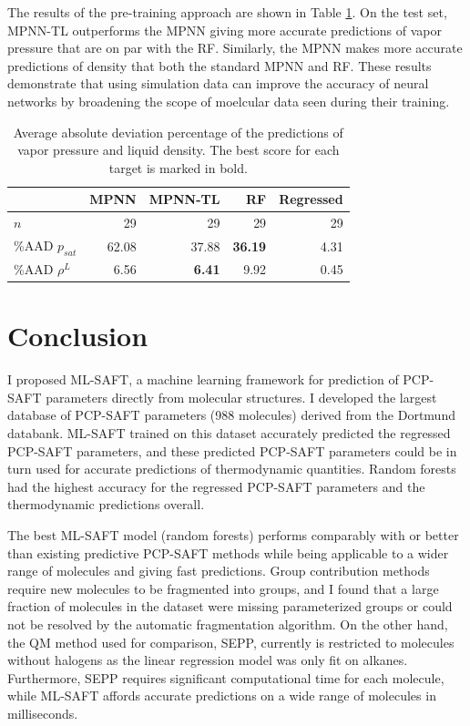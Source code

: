 The results of the pre-training approach are shown in Table \ref{tab:scores_tl}. On the test set, MPNN-TL outperforms the MPNN giving more accurate predictions of vapor pressure that are on par with the RF. Similarly, the MPNN makes more accurate predictions of density that both the standard MPNN and RF. These results demonstrate that using simulation data can improve the accuracy of neural networks by broadening the scope of moelcular data seen during their training. 

\begin{table}
    \caption{Average absolute deviation percentage of the predictions of vapor pressure and liquid density. The best score for each target is marked in bold.}
    \begin{center}
        \begin{tabular}{lrrr|r}
             & MPNN & MPNN-TL & RF & Regressed \\
            \hline
            $n$ & 29 & 29 & 29 & 29 \\
            \%AAD $p_{sat}$ & 62.08 & 37.88 & \textbf{36.19} & 4.31 \\
            \%AAD $\rho^{L}$ & 6.56 & \textbf{6.41} & 9.92 & 0.45 \\
        \end{tabular}
    \end{center}
    \label{tab:scores_tl}
\end{table}


\section{Conclusion}

I proposed ML-SAFT, a machine learning framework for prediction of PCP-SAFT parameters directly from molecular structures. I developed the largest database of PCP-SAFT parameters (988 molecules) derived from the Dortmund databank. ML-SAFT trained on this dataset accurately predicted the regressed PCP-SAFT parameters, and these predicted PCP-SAFT parameters could be in turn used for accurate predictions of thermodynamic quantities. Random forests had the highest accuracy for the regressed PCP-SAFT parameters and the thermodynamic predictions overall.

The best ML-SAFT model (random forests) performs comparably with or better than existing predictive PCP-SAFT methods while being applicable to a wider range of molecules and giving fast predictions. Group contribution methods require new molecules to be fragmented into groups, and I found that a large fraction of molecules in the dataset were missing parameterized groups or could not be resolved by the automatic fragmentation algorithm. On the other hand, the QM method used for comparison, SEPP, currently is restricted to molecules without halogens as the linear regression model was only fit on alkanes. Furthermore, SEPP requires significant computational time for each molecule, while ML-SAFT affords accurate predictions on a wide range of molecules in milliseconds.

